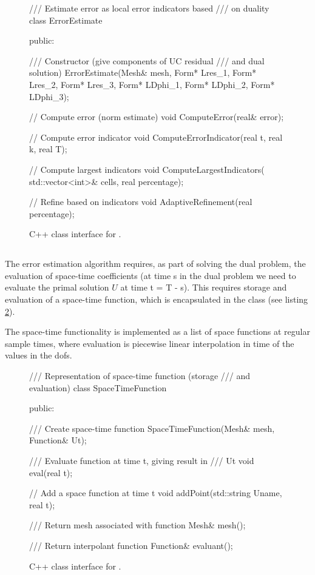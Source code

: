 \begin{figure}
\begin{c++}
/// Estimate error as local error indicators based
/// on duality
class ErrorEstimate
{
public:

  /// Constructor (give components of UC residual
  /// and dual solution)
  ErrorEstimate(Mesh& mesh,
		Form* Lres_1,
		Form* Lres_2,
		Form* Lres_3,
		Form* LDphi_1,
		Form* LDphi_2,
		Form* LDphi_3);

  // Compute error (norm estimate)
  void ComputeError(real& error);

  // Compute error indicator
  void ComputeErrorIndicator(real t, real k,
                             real T);

  // Compute largest indicators
  void ComputeLargestIndicators(
    std::vector<int>& cells,
    real percentage);

  // Refine based on indicators
  void AdaptiveRefinement(real percentage);
}
\end{c++}
\caption{C++ class interface for .}
\label{code:ErrorEstimate}
\end{figure}

\subsection{}

The error estimation algorithm requires, as part of solving the dual
problem, the evaluation of space-time coefficients (at time s in the
dual problem we need to evaluate the primal solution $U$ at time t =
T - s). This requires storage and evaluation of a space-time function,
which is encapsulated in the  class (see listing
\ref{code:SpaceTimeFunction}).

The space-time functionality is implemented as a list of space
functions at regular sample times, where evaluation is piecewise linear
interpolation in time of the values in the dofs.

\begin{figure}
\begin{c++}
/// Representation of space-time function (storage
/// and evaluation)
class SpaceTimeFunction
{
public:

  /// Create space-time function
  SpaceTimeFunction(Mesh& mesh, Function& Ut);

  /// Evaluate function at time t, giving result in
  /// Ut
  void eval(real t);

  // Add a space function at time t
  void addPoint(std::string Uname, real t);

  /// Return mesh associated with function
  Mesh& mesh();

  /// Return interpolant function
  Function& evaluant();
}
\end{c++}
\caption{C++ class interface for .}
\label{code:SpaceTimeFunction}
\end{figure}

